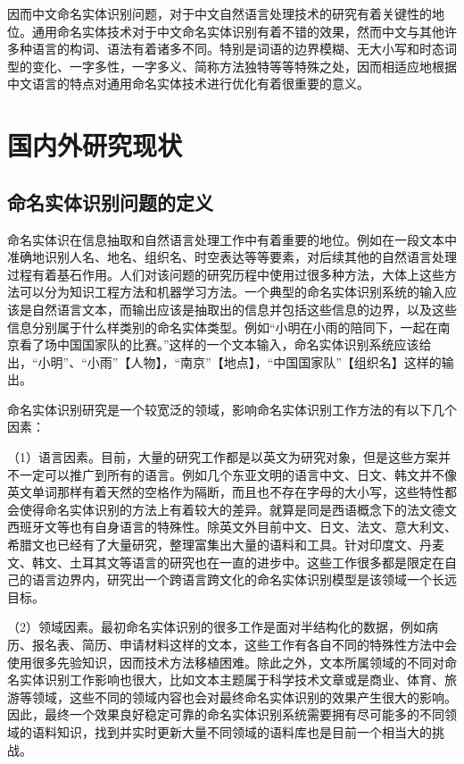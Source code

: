 \documentclass[winfonts,master,oneside,nobackinfo]{njuthesis}
\begin{document}
因而中文命名实体识别问题，对于中文自然语言处理技术的研究有着关键性的地位。通用命名实体技术对于中文命名实体识别有着不错的效果，然而中文与其他许多种语言的构词、语法有着诸多不同。特别是词语的边界模糊、无大小写和时态词型的变化、一字多性，一字多义、简称方法独特等等特殊之处，因而相适应地根据中文语言的特点对通用命名实体技术进行优化有着很重要的意义。



\section{国内外研究现状}
\subsection{命名实体识别问题的定义}
命名实体识在信息抽取和自然语言处理工作中有着重要的地位。例如在一段文本中准确地识别人名、地名、组织名、时空表达等等要素，对后续其他的自然语言处理过程有着基石作用。人们对该问题的研究历程中使用过很多种方法，大体上这些方法可以分为知识工程方法和机器学习方法。一个典型的命名实体识别系统的输入应该是自然语言文本，而输出应该是抽取出的信息并包括这些信息的边界，以及这些信息分别属于什么样类别的命名实体类型。例如“小明在小雨的陪同下，一起在南京看了场中国国家队的比赛。”这样的一个文本输入，命名实体识别系统应该给出，“小明”、“小雨”【人物】，“南京”【地点】，“中国国家队”【组织名】这样的输出。

命名实体识别研究是一个较宽泛的领域，影响命名实体识别工作方法的有以下几个因素\cite{ASTUDY}：

（1）语言因素。目前，大量的研究工作都是以英文为研究对象，但是这些方案并不一定可以推广到所有的语言。例如几个东亚文明的语言中文、日文、韩文并不像英文单词那样有着天然的空格作为隔断，而且也不存在字母的大小写，这些特性都会使得命名实体识别的方法上有着较大的差异。就算是同是西语概念下的法文德文西班牙文等也有自身语言的特殊性。除英文外目前中文、日文、法文、意大利文、希腊文也已经有了大量研究，整理富集出大量的语料和工具。针对印度文、丹麦文、韩文、土耳其文等语言的研究也在一直的进步中。这些工作很多都是限定在自己的语言边界内，研究出一个跨语言跨文化的命名实体识别模型是该领域一个长远目标。

（2）领域因素。最初命名实体识别的很多工作是面对半结构化的数据，例如病历、报名表、简历、申请材料这样的文本，这些工作有各自不同的特殊性方法中会使用很多先验知识，因而技术方法移植困难。除此之外，文本所属领域的不同对命名实体识别工作影响也很大，比如文本主题属于科学技术文章或是商业、体育、旅游等领域，这些不同的领域内容也会对最终命名实体识别的效果产生很大的影响。因此，最终一个效果良好稳定可靠的命名实体识别系统需要拥有尽可能多的不同领域的语料知识，找到并实时更新大量不同领域的语料库也是目前一个相当大的挑战。
\end{document}
